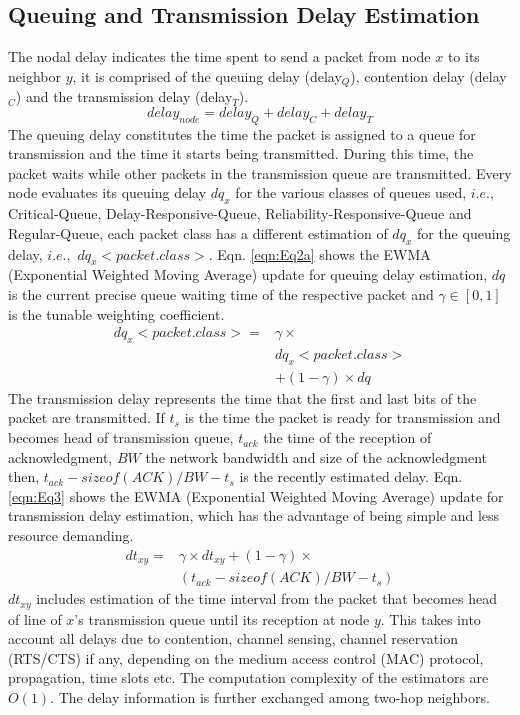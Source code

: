 \documentclass[fleqn,twoside]{article}
\begin{document}
\subsection{Queuing and Transmission Delay Estimation}
The nodal delay indicates the time spent to send a packet from node $x$ to its neighbor $y$, it is comprised of the 
queuing delay (delay$_Q$), contention delay (delay$_C$) and the transmission delay (delay$_T$).
\begin{equation}
delay_{node} = delay_{Q} + delay_{C} + delay_{T}
\label{eqn:Eq2}
\end{equation}
The queuing delay constitutes the time the packet is assigned to a queue for transmission and the time it starts being transmitted. During this time, the packet waits while other packets in the transmission queue are transmitted.
Every node evaluates its queuing delay $dq_x$ for the various classes of queues used, $i.e.,$ Critical-Queue, Delay-Responsive-Queue, Reliability-Responsive-Queue and Regular-Queue, each packet class has a different estimation of $dq_x$ for the queuing 
delay, $i.e.,$ $dq_x<packet.class>$. Eqn. \ref{eqn:Eq2a} shows the EWMA (Exponential Weighted Moving Average) update for queuing delay estimation, $dq$ is the current precise queue waiting time of the respective packet and $\gamma \in [0,1]$ is the 
tunable weighting coefficient.
\begin{equation}
\begin{split}
dq_{x}<packet.class> = &\gamma \times \\
 		       & dq_{x}<packet.class> \\
                       & + (1-\gamma) \times dq
\label{eqn:Eq2a}
\end{split}
\end{equation}
The transmission delay represents the time that the first and last bits of the packet
are transmitted. If $t_{s}$ is the time the packet is ready for transmission and becomes head of transmission queue, $t_{ack}$ the 
time of the reception of acknowledgment, $BW$ the network bandwidth and size of the acknowledgment then, $t_{ack} - sizeof(ACK)/BW - t_{s}$ is the recently
estimated delay. Eqn. \ref{eqn:Eq3} shows the EWMA (Exponential Weighted 
Moving Average) update for transmission delay 
estimation, which has the advantage of being simple and less resource demanding. 
\begin{equation}
\begin{split}
dt_{xy} = &\gamma \times dt_{xy} + (1-\gamma) \times \\
          &(t_{ack} - sizeof(ACK)/BW - t_{s})
\label{eqn:Eq3}
\end{split}
\end{equation}
$dt_{xy}$ includes estimation of the time interval from the packet that becomes head of line of $x$'s transmission queue until 
its reception at node $y$. This takes into account all delays due
to contention, channel sensing, channel reservation (RTS/CTS) if any, depending on the medium access control (MAC) protocol,
propagation, time slots etc. The computation complexity of the estimators are $O(1)$. The delay information is further exchanged among two-hop neighbors.
\end{document}
